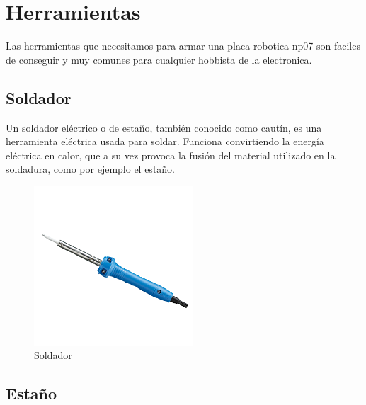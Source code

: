 
\chapter{Herramientas}

Las herramientas que necesitamos para armar una placa robotica np07 son faciles de conseguir y muy comunes para cualquier hobbista de la electronica.

\section{Soldador}

Un soldador eléctrico o de estaño, también conocido como cautín, es una herramienta eléctrica usada para soldar.
Funciona convirtiendo la energía eléctrica en calor, que a su vez provoca la fusión del material utilizado en la soldadura, como por ejemplo el estaño.

\begin{figure}[h]
	\centering
	\includegraphics[width=0.5\linewidth]{herramientas/soldador}
	\caption{Soldador}
	\label{fig:soldador}
\end{figure}

\newpage

\section{Estaño}

